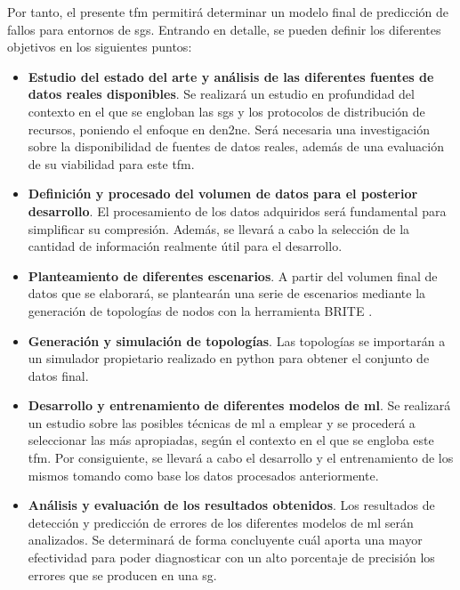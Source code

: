 \vspace{3mm}

Por tanto, el presente \gls{tfm} permitirá determinar un modelo final de predicción de fallos para entornos de \gls{sg}s. Entrando en detalle, se pueden definir los diferentes objetivos en los siguientes puntos:

\pagebreak

\begin{itemize}
    \item \textbf{Estudio del estado del arte y análisis de las diferentes fuentes de datos reales disponibles}. Se realizará un estudio en profundidad del contexto en el que se engloban las \gls{sg}s y los protocolos de distribución de recursos, poniendo el enfoque en \gls{den2ne}. Será necesaria una investigación sobre la disponibilidad de fuentes de datos reales, además de una evaluación de su viabilidad para este \gls{tfm}.
    
    \item \textbf{Definición y procesado del volumen de datos para el posterior desarrollo}. El procesamiento de los datos adquiridos será fundamental para simplificar su compresión. Además, se llevará a cabo la selección de la cantidad de información realmente útil para el desarrollo.    

    \item \textbf{Planteamiento de diferentes escenarios}. A partir del volumen final de datos que se elaborará, se plantearán una serie de escenarios mediante la generación de topologías de nodos con la herramienta BRITE \cite{brite}.
    
    \item \textbf{Generación y simulación de topologías}. Las topologías se importarán a un simulador propietario realizado en python para obtener el conjunto de datos final.
    
    \item \textbf{Desarrollo y entrenamiento de diferentes modelos de \gls{ml}}. Se realizará un estudio sobre las posibles técnicas de \gls{ml} a emplear y se procederá a seleccionar las más apropiadas, según el contexto en el que se engloba este \gls{tfm}. Por consiguiente, se llevará a cabo el desarrollo y el entrenamiento de los mismos tomando como base los datos procesados anteriormente. 
    
    \item \textbf{Análisis y evaluación de los resultados obtenidos}. Los resultados de detección y predicción de errores de los diferentes modelos de \gls{ml} serán analizados. Se determinará de forma concluyente cuál aporta una mayor efectividad para poder diagnosticar con un alto porcentaje de precisión los errores que se producen en una \gls{sg}.
    
\end{itemize}

